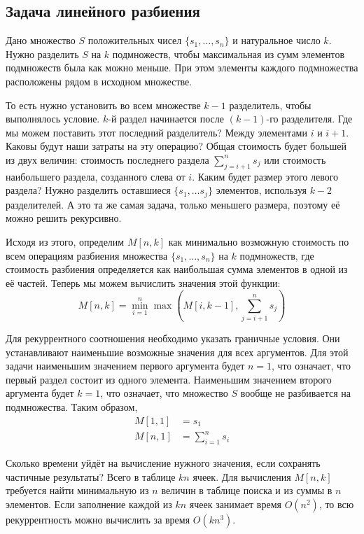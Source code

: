 \documentclass[14pt]{book}
\begin{document}
\subsection{Задача линейного разбиения}

Дано множество $S$ положительных чисел $\{s_1, \ldots , s_n\}$ и натуральное число $k$.
Нужно разделить $S$ на $k$ подмножеств, чтобы максимальная из сумм элементов подмножеств была 
как можно меньше. При этом элементы каждого подмножества расположены рядом в исходном множестве.

То есть нужно установить во всем множестве $k-1$ разделитель, чтобы выполнялось условие.
$k$-й раздел начинается после $(k-1)$-го разделителя. Где мы можем поставить этот последний
разделитель? Между элементами $i$ и $i+1$. Каковы будут наши затраты на эту операцию?
Общая стоимость будет большей из двух величин: стоимость последнего раздела $\sum_{j=i+1}^{n}s_j$
или стоимость наибольшего раздела, созданного слева от $i$. Каким будет размер этого левого раздела?
Нужно разделить оставшиеся $\{s_1,\ldots s_j\}$ элементов, используя $k-2$ разделителей.
А это та же самая задача, только меньшего размера, поэтому её можно решить рекурсивно.

Исходя из этого, определим $M[n, k]$ как минимально возможную стоимость по всем операциям
разбиения множества $\{s_1, \ldots , s_n\}$ на $k$ подмножеств, где стоимость разбиения
определяется как наибольшая сумма элементов в одной из её частей. Теперь мы можем вычислить
значения этой функции:
$$ M[n,k] = \min_{i=1}^{n}\max\left(M[i,k-1], \sum_{j=i+1}^{n}s_j\right)$$

Для рекуррентного соотношения необходимо указать граничные условия. Они устанавливают
наименьшие возможные значения для всех аргументов. Для этой задачи наименьшим значением
первого аргумента будет $n=1$, что означает, что первый раздел состоит из одного элемента.
Наименьшим значением второго аргумента будет $k=1$, что означает, что множество $S$
вообще не разбивается на подмножества. Таким образом,
\begin{align*}
M[1,1] &= s_1 \\
M[n,1] &= \sum_{i=1}^{n}s_i
\end{align*}

Сколько времени уйдёт на вычисление нужного значения, если сохранять частичные результаты?
Всего в таблице $kn$ ячеек. Для вычисления $M[n,k]$ требуется найти минимальную из $n$ величин
в таблице поиска и из суммы в $n$ элементов. Если заполнение каждой из $kn$ ячеек занимает время 
$O(n^2)$, то всю рекуррентность можно вычислить за время $O(kn^3)$.
\end{document}
